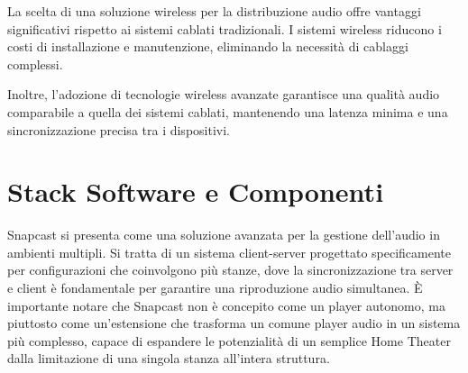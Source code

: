 La scelta di una soluzione wireless per la distribuzione audio offre vantaggi significativi rispetto ai sistemi cablati tradizionali. I sistemi wireless riducono i costi di installazione e manutenzione, eliminando la necessità di cablaggi complessi. 

Inoltre, l'adozione di tecnologie wireless avanzate garantisce una qualità audio comparabile a quella dei sistemi cablati, mantenendo una latenza minima e una sincronizzazione precisa tra i dispositivi. \cite{7990980}

\section{Stack Software e Componenti}
\noindent

Snapcast si presenta come una soluzione avanzata per la gestione dell'audio in ambienti multipli.  Si tratta di un sistema client-server progettato specificamente per configurazioni che coinvolgono più stanze, dove la sincronizzazione tra server e client è fondamentale per garantire una riproduzione audio simultanea. È importante notare che Snapcast non è concepito come un player autonomo, ma piuttosto come un'estensione che trasforma un comune player audio in un sistema più complesso, capace di espandere le potenzialità di un semplice Home Theater dalla limitazione di una singola stanza all'intera struttura.

